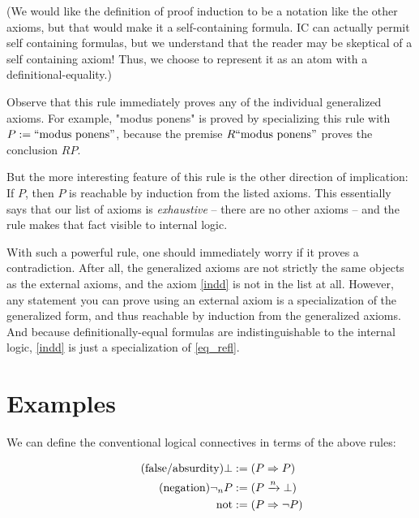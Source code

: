 \documentclass{article}
\begin{document}
  (We would like the definition of proof induction to be a notation like the other axioms, but that would make it a self-containing formula. IC can actually permit self containing formulas, but we understand that the reader may be skeptical of a self containing axiom! Thus, we choose to represent it as an atom with a definitional-equality.)
  
  Observe that this rule immediately proves any of the individual generalized axioms. For example, "modus ponens" is proved by specializing this rule with $P := \mathrm{``modus\ ponens"}$, because the premise $R\mathrm{``modus\ ponens"}$ proves the conclusion $RP$.
  
  But the more interesting feature of this rule is the other direction of implication: If $P$, then $P$ is reachable by induction from the listed axioms. This essentially says that our list of axioms is \emph{exhaustive} – there are no other axioms – and the rule makes that fact visible to internal logic.
  
With such a powerful rule, one should immediately worry if it proves a contradiction. After all, the generalized axioms are not strictly the same objects as the external axioms, and the axiom \eqref{indd} is not in the list at all. However, any statement you can prove using an external axiom is a specialization of the generalized form, and thus reachable by induction from the generalized axioms. And because definitionally-equal formulas are indistinguishable to the internal logic, \eqref{indd} is just a specialization of \eqref{eq_refl}.

  \section{Examples}\label{structure}

  We can define the conventional logical connectives in terms of the above rules:

  \setlength{\jot}{0.4em}
  \begin{align*}
    \tag{false/absurdity}
    \bot &:= (P \Rightarrow{P})\\
    \tag{negation}
    \neg_{n} P &:= ({P \xrightarrow{n} \bot})\\
    \mathrm{not} &:= (P \Rightarrow \neg P)\\
  \end{align*}
\end{document}
